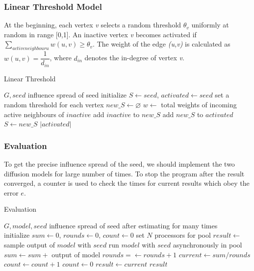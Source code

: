 \documentclass[9pt,shortpaper,twoside,web]{ieeecolor}
\begin{document}
\subsubsection{Linear Threshold Model}
At the beginning, each vertex \textit{v} selects a random threshold $\theta_v$ uniformly at random in range [0,1]. An inactive vertex \textit{v} becomes activated if
$\sum_{active neighbour u}^{} w(u,v) \geq\theta_v$. The weight of the edge \textit{(u,v)} is calculated as $w(u,v)=\dfrac{1}{d_{in}}$, where $d_{in}$ denotes the in-degree of vertex \textit{v}.
\begin{algorithm}
\caption{Linear Threshold}
\begin{algorithmic} [h]
\renewcommand{\algorithmicrequire}{\textbf{Input:}}
\renewcommand{\algorithmicensure}{\textbf{Output:}}
\REQUIRE $G, seed$
\ENSURE influence spread of seed
\STATE initialize $S \gets seed$, $activated \gets seed$
\STATE set a random threshold for each vertex
\STATE $new\_S \gets \varnothing$
\STATE $w\gets$ total weights of incoming active neighbours of $inactive$
\STATE add $inactive$ to $new\_S$
\ENDIF
\ENDFOR
\ENDFOR
\STATE add $new\_S$ to $activated$
\STATE $S\gets new\_S$
\ENDWHILE
\RETURN $|activated|$
\end{algorithmic}
\end{algorithm}

\subsubsection{Evaluation}
To get the precise influence spread of the seed, we should implement the two diffusion models for large number of times. To stop the program after the result converged, a counter is used to check the times for current results which obey the error $e$. 

\begin{algorithm}
\caption{Evaluation}
\begin{algorithmic}[h]
\renewcommand{\algorithmicrequire}{\textbf{Input:}}
\renewcommand{\algorithmicensure}{\textbf{Output:}}
\REQUIRE $G, model, seed$
\ENSURE influence spread of seed after estimating for many times
\\
\STATE initialize $sum\gets0$, $rounds\gets0$, $count\gets0$
\STATE set $N$ processors for pool
\STATE $result\gets$ sample output of $model$ with $seed$
\STATE run $model$ with $seed$ asynchronously in pool
\STATE $sum\gets sum+$ output of model 
\STATE $rounds=\gets rounds+1$
\STATE $current\gets sum/rounds$
\STATE $count\gets count+1$
\ELSE
\STATE $count\gets 0$
\ENDIF
\STATE $result\gets current$
\ENDWHILE
\RETURN $result$
\end{algorithmic} 
\end{algorithm}
\end{document}
